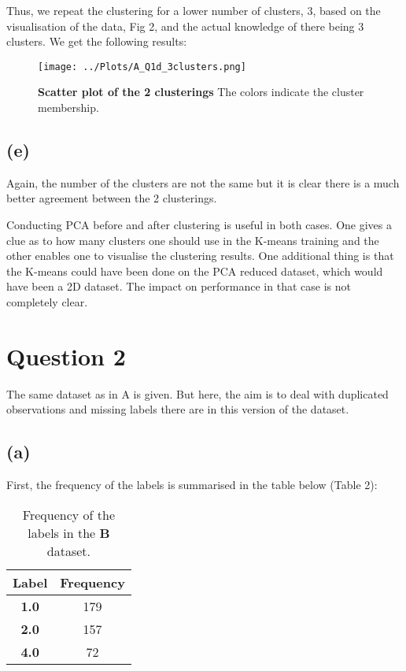 \documentclass[12pt]{report} %
\begin{document}
Thus, we repeat the clustering for a lower number of clusters, 3, based on the visualisation of the data, Fig 2, and the actual knowledge of there being 3 clusters. We get the following results:


\begin{figure}[h]
    \centering
    \texttt{[image: ../Plots/A\_Q1d\_3clusters.png]}
    \caption{\textbf{Scatter plot of the 2 clusterings} The colors indicate the cluster membership.}
\end{figure}

\subsection*{(e)}

Again, the number of the clusters are not the same but it is clear there is a much better agreement between the 2 clusterings. 

Conducting PCA before and after clustering is useful in both cases. One gives a clue as to how many clusters one should use in the K-means training and the other enables one to visualise the clustering results. One additional thing is that the K-means could have been done on the PCA reduced dataset, which would have been a 2D dataset. The impact on performance in that case is not completely clear.


\section*{Question 2}

The same dataset as in A is given. But here, the aim is to deal with duplicated observations and missing labels there are in this version of the dataset.

\subsection*{(a)}

First, the frequency of the labels is summarised in the table below (Table 2):

\begin{table}[h]
\centering
\begin{tabular}{ |c|c| }
    \hline
    \textbf{Label} & \textbf{Frequency} \\
    \hline
    \textbf{1.0} & 179 \\ 
    \hline
    \textbf{2.0} & 157 \\
    \hline
    \textbf{4.0} & 72 \\
    \hline
\end{tabular}
\caption{Frequency of the labels in the \textbf{B} dataset.}
\end{table}
\end{document}
